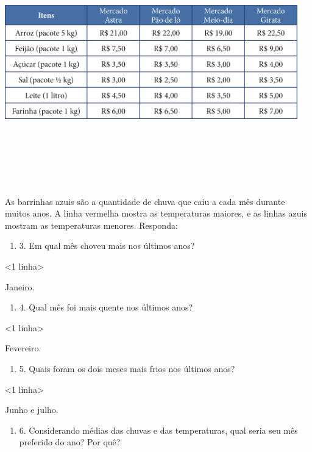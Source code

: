 \includegraphics[width=5.00000in,height=4.17708in]{media/image92.png}

As barrinhas azuis são a quantidade de chuva que caiu a cada mês durante
muitos anos. A linha vermelha mostra as temperaturas maiores, e as
linhas azuis mostram as temperaturas menores. Responda:

\begin{enumerate}
\def\labelenumi{\alph{enumi})}
\item
3. Em qual mês choveu mais nos últimos anos?
\end{enumerate}

\textless{}1 linha\textgreater{}

Janeiro.

\begin{enumerate}
\def\labelenumi{\alph{enumi})}
\item
4. Qual mês foi mais quente nos últimos anos?
\end{enumerate}

\textless{}1 linha\textgreater{}

Fevereiro.

\begin{enumerate}
\def\labelenumi{\alph{enumi})}
\item
5. Quais foram os dois meses mais frios nos últimos anos?
\end{enumerate}

\textless{}1 linha\textgreater{}

Junho e julho.

\begin{enumerate}
\def\labelenumi{\alph{enumi})}
\item
6. Considerando médias das chuvas e das temperaturas, qual seria seu mês preferido do ano? Por quê?
\end{enumerate}

